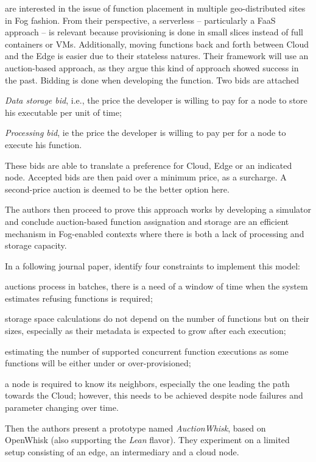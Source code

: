 \documentclass[11pt]{sdm}
\begin{document}
\begin{description}[leftmargin=10pt]
	\item[\citet{bermbach_towards_2020}] are interested in the issue of function placement in multiple geo-distributed sites in Fog fashion. From their perspective, a serverless -- particularly a \gls{FaaS} approach -- is relevant because provisioning is done in small slices instead of full containers or \glspl{VM}. Additionally, moving functions back and forth between Cloud and the Edge is easier due to their stateless natures. Their framework will use an auction-based approach, as they argue this kind of approach showed success in the past.
		Bidding is done when developing the function. Two bids are attached
		\begin{enumerate*}[(a)]
			\item \emph{Data storage bid}, i.e., the price the developer is willing to pay for a node to store his executable per unit of time;
			\item \emph{Processing bid}, ie the price the developer is willing to pay per for a node to execute his function.
		\end{enumerate*}
		These bids are able to translate a preference for Cloud, Edge or an indicated node. Accepted bids are then paid over a minimum price, as a surcharge. A second-price auction is deemed to be the better option here.

		The authors then proceed to prove this approach works by developing a simulator and conclude auction-based function assignation and storage are an efficient mechanism in Fog-enabled contexts where there is both a lack of processing and storage capacity.

		In a following journal paper, \citet{bermbach_auctionwhisk_2021} identify four constraints to implement this model:
		\begin{enumerate*}[(i)]
			\item auctions process in batches, there is a need of a window of time when the system estimates refusing functions is required;
			\item storage space calculations do not depend on the number of functions but on their sizes, especially as their metadata is expected to grow after each execution;
			\item estimating the number of supported concurrent function executions as some functions will be either under or over-provisioned;
			\item a node is required to know its neighbors, especially the one leading the path towards the Cloud; however, this needs to be achieved despite node failures and parameter changing over time.
		\end{enumerate*}

		Then the authors present a prototype named \emph{AuctionWhisk}, based on OpenWhisk (also supporting the \emph{Lean} flavor). They experiment on a limited setup consisting of an edge, an intermediary and a cloud node.

\end{description}
\end{document}

